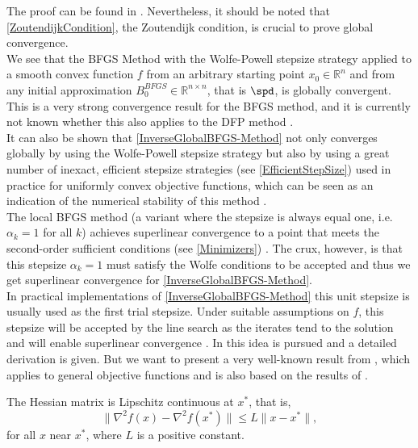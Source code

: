 The proof can be found in \cite[p.~154]{NocedalWright:2006}. Nevertheless, it should be noted that \cref{ZoutendijkCondition}, the Zoutendijk condition, is crucial to prove global convergence. \\
We see that the BFGS Method with the Wolfe-Powell stepsize strategy applied to a smooth convex function $f$ from an arbitrary starting point $x_0 \in \mathbb{R}^n$ and from any initial approximation $B^{BFGS}_0 \in \mathbb{R}^{n \times n}$, that is $\spd$, is globally convergent. This is a very strong convergence result for the BFGS method, and it is currently not known whether this also applies to the DFP method \cite[p.~156]{NocedalWright:2006}. \\
It can also be shown that \cref{InverseGlobalBFGS-Method} not only converges globally by using the Wolfe-Powell stepsize strategy but also by using a great number of inexact, efficient stepsize strategies (see \cref{EfficientStepSize}) used in practice for uniformly convex objective functions, which can be seen as an indication of the numerical stability of this method \cite[p.~327]{Werner:1978}. \\
The local BFGS method (a variant where the stepsize is always equal one, i.e. $\alpha_k = 1$ for all $k$) achieves superlinear convergence to a point that meets the second-order sufficient conditions (see \cref{Minimizers}) \cite[Satz~11.33]{GeigerKanzow:1999}. The crux, however, is that this stepsize $\alpha_k = 1$ must satisfy the Wolfe conditions to be accepted and thus we get superlinear convergence for \cref{InverseGlobalBFGS-Method}. \\
In practical implementations of \cref{InverseGlobalBFGS-Method} this unit stepsize is usually used as the first trial stepsize. Under suitable assumptions on $f$, this stepsize will be accepted by the line search as the iterates tend to the solution and will enable superlinear convergence \cite[p.~6]{Dai:2012}. In \cite{DennisMore:1974} this idea is pursued and a detailed derivation is given. But we want to present a very well-known result from \cite{NocedalWright:2006}, which applies to general objective functions and is also based on the results of \cite{DennisMore:1974}. 

\begin{assumption}\label{AssumptionsSuperlinearConvergence}
    The Hessian matrix is Lipschitz continuous at $x^*$, that is,
    \begin{equation*}
        \lVert \nabla^2 f(x) - \nabla^2 f(x^*) \rVert \leq L \lVert x - x^* \rVert,
    \end{equation*}
    for all $x$ near $x^*$, where $L$ is a positive constant.
\end{assumption}


